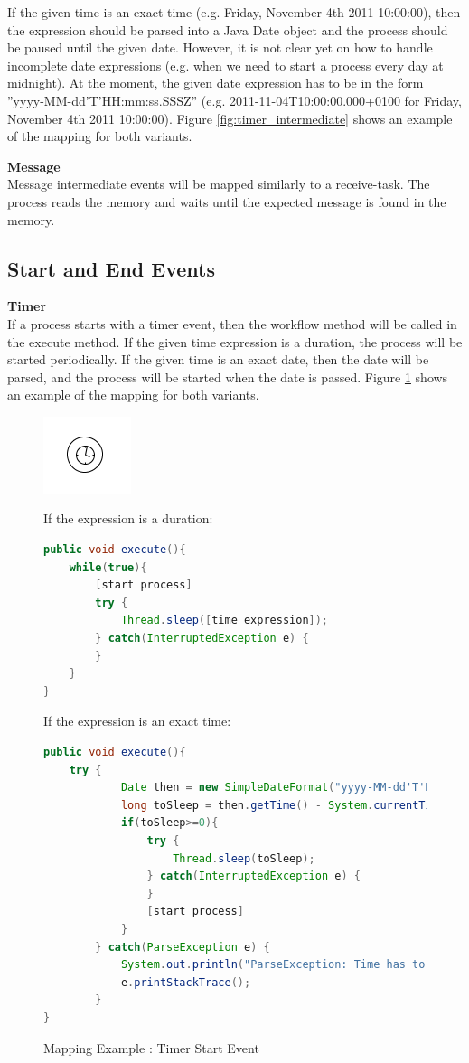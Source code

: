 If the given time is an exact time (e.g. Friday, November 4th 2011 10:00:00), then the expression should be parsed into a Java Date object and the process should be paused until the given date. However, it is not clear yet on how to handle incomplete date expressions (e.g. when we need to start a process every day at midnight). At the moment, the given date expression has to be in the form ''yyyy-MM-dd'T'HH:mm:ss.SSSZ'' (e.g. 2011-11-04T10:00:00.000+0100 for Friday, November 4th 2011 10:00:00). Figure \ref{fig:timer_intermediate}
shows an example of the mapping for both variants.

\textbf{Message}\\
Message intermediate events will be mapped similarly to a receive-task. The process reads the memory and waits until the expected message is found in the memory. 

\subsection{Start and End Events}

\textbf{Timer}\\
If a process starts with a timer event, then the workflow method will be called in the execute method. If the given time expression is a duration, the process will be started periodically. If the given time is an exact date, then the date will be parsed, and the process will be started when the date is passed. Figure \ref{fig:timer_start} shows an example of the mapping for both variants.

\begin{figure}[h]
\begin{minipage}[c]{0.28\textwidth}
\includegraphics{images/mapping/timer_start.png}
\end{minipage}
\begin{minipage}[c]{0.72\textwidth}
If the expression is a duration:
\begin{lstlisting}[language = Java]
public void execute(){
	while(true){
		[start process]
		try {
			Thread.sleep([time expression]);
		} catch(InterruptedException e) {
		}
	}
}
\end{lstlisting}
If the expression is an exact time:
\begin{lstlisting}[language = Java]
public void execute(){
	try {
			Date then = new SimpleDateFormat("yyyy-MM-dd'T'HH:mm:ss.SSSZ").parse("2011-11-04T10:00:00.000+0100");
			long toSleep = then.getTime() - System.currentTimeMillis();
			if(toSleep>=0){
				try {
					Thread.sleep(toSleep);
				} catch(InterruptedException e) {
				}
				[start process]
			}
		} catch(ParseException e) {
			System.out.println("ParseException: Time has to be in yyyy-MM-dd'T'HH:mm:ss.SSSZ form");
			e.printStackTrace();
		}
}
\end{lstlisting}
\end{minipage}
\caption{Mapping Example : Timer Start Event}%
\label{fig:timer_start}%
\end{figure}

